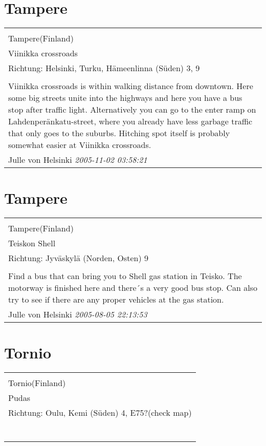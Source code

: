 \documentclass[a4paper,12pt]{article}
\begin{document}
\section{Tampere}
\begin{tabular}{|p{13cm}|}
\hline\\
Tampere(Finland)\\
Viinikka crossroads\\
Richtung: Helsinki, Turku, Hämeenlinna (Süden) 3, 9 \\
\hline\\
Viinikka crossroads is within walking distance from downtown. Here some big streets unite into the highways and here you have a bus stop after traffic light. Alternatively you can go to the enter ramp on Lahdenperänkatu-street, where you already have less garbage traffic that only goes to the suburbs. Hitching spot itself is probably somewhat easier at Viinikka crossroads. \\
Julle von Helsinki \textit{ 2005-11-02 03:58:21 }\\\hline
\end{tabular}


\section{Tampere}
\begin{tabular}{|p{13cm}|}
\hline\\
Tampere(Finland)\\
Teiskon Shell\\
Richtung: Jyväskylä (Norden, Osten) 9 \\
\hline\\
Find a bus that can bring you to Shell gas station in Teisko. The motorway is finished here and there´s a very good bus stop. Can also try to see if there are any proper vehicles at the gas station. \\
Julle von Helsinki \textit{ 2005-08-05 22:13:53 }\\\hline
\end{tabular}


\section{Tornio}
\begin{tabular}{|p{13cm}|}
\hline\\
Tornio(Finland)\\
Pudas\\
Richtung: Oulu, Kemi (Süden) 4, E75?(check map) \\
\hline\\
\\\
\end{tabular}
\end{document}
